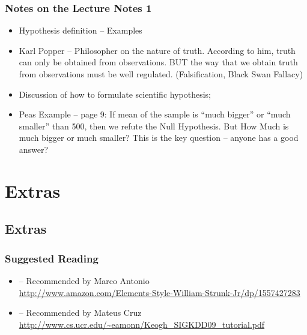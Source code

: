 \documentclass[t]{beamer}
\begin{document}
\begin{frame}
  \frametitle{Notes on the Lecture Notes 1}
  {\smaller
    \begin{itemize}
    \item Hypothesis definition -- Examples
    \item Karl Popper -- Philosopher on the nature of truth. According
      to him, truth can only be obtained from
      observations. \alert{BUT} the way that we obtain truth from
      observations must be well regulated. (Falsification, Black Swan Fallacy)
    \item Discussion of how to formulate scientific hypothesis;
    \item Peas Example -- page 9: If mean of the sample is ``much
      bigger'' or ``much smaller'' than 500, then we refute the Null
      Hypothesis. But \alert{How Much} is much bigger or much smaller?
      This is the key question -- anyone has a good answer?
    \end{itemize}
  }
\end{frame}



\section{Extras}
\subsection{Extras}

\begin{frame}
  \frametitle{Suggested Reading}
  \begin{itemize}
  \item {} -- Recommended by Marco Antonio\\
    \url{http://www.amazon.com/Elements-Style-William-Strunk-Jr/dp/1557427283}
  \item {} -- Recommended by Mateus Cruz\\
    \url{http://www.cs.ucr.edu/~eamonn/Keogh_SIGKDD09_tutorial.pdf}
  \end{itemize}
\end{frame}
\end{document}
